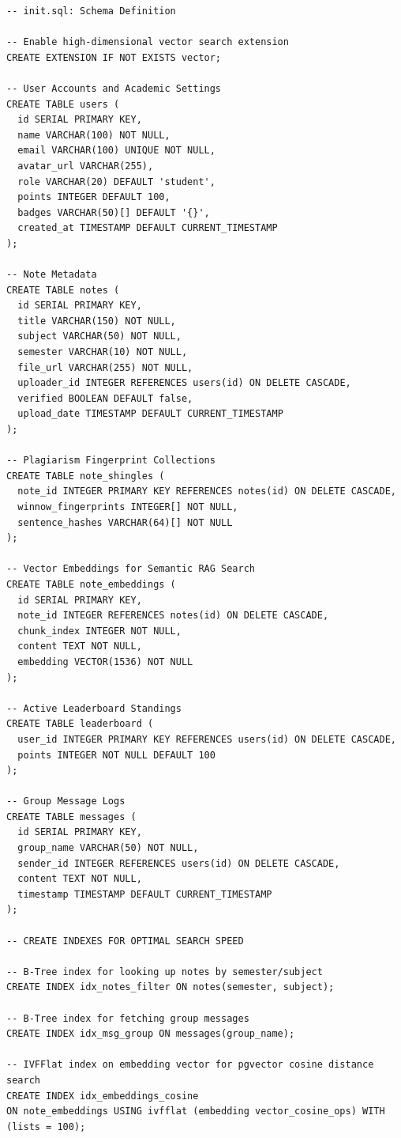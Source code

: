 \documentclass[12,Times new Roman,a4paper]{report}
\begin{document}
\begin{verbatim}
-- init.sql: Schema Definition

-- Enable high-dimensional vector search extension
CREATE EXTENSION IF NOT EXISTS vector;

-- User Accounts and Academic Settings
CREATE TABLE users (
  id SERIAL PRIMARY KEY,
  name VARCHAR(100) NOT NULL,
  email VARCHAR(100) UNIQUE NOT NULL,
  avatar_url VARCHAR(255),
  role VARCHAR(20) DEFAULT 'student',
  points INTEGER DEFAULT 100,
  badges VARCHAR(50)[] DEFAULT '{}',
  created_at TIMESTAMP DEFAULT CURRENT_TIMESTAMP
);

-- Note Metadata
CREATE TABLE notes (
  id SERIAL PRIMARY KEY,
  title VARCHAR(150) NOT NULL,
  subject VARCHAR(50) NOT NULL,
  semester VARCHAR(10) NOT NULL,
  file_url VARCHAR(255) NOT NULL,
  uploader_id INTEGER REFERENCES users(id) ON DELETE CASCADE,
  verified BOOLEAN DEFAULT false,
  upload_date TIMESTAMP DEFAULT CURRENT_TIMESTAMP
);

-- Plagiarism Fingerprint Collections
CREATE TABLE note_shingles (
  note_id INTEGER PRIMARY KEY REFERENCES notes(id) ON DELETE CASCADE,
  winnow_fingerprints INTEGER[] NOT NULL,
  sentence_hashes VARCHAR(64)[] NOT NULL
);

-- Vector Embeddings for Semantic RAG Search
CREATE TABLE note_embeddings (
  id SERIAL PRIMARY KEY,
  note_id INTEGER REFERENCES notes(id) ON DELETE CASCADE,
  chunk_index INTEGER NOT NULL,
  content TEXT NOT NULL,
  embedding VECTOR(1536) NOT NULL
);

-- Active Leaderboard Standings
CREATE TABLE leaderboard (
  user_id INTEGER PRIMARY KEY REFERENCES users(id) ON DELETE CASCADE,
  points INTEGER NOT NULL DEFAULT 100
);

-- Group Message Logs
CREATE TABLE messages (
  id SERIAL PRIMARY KEY,
  group_name VARCHAR(50) NOT NULL,
  sender_id INTEGER REFERENCES users(id) ON DELETE CASCADE,
  content TEXT NOT NULL,
  timestamp TIMESTAMP DEFAULT CURRENT_TIMESTAMP
);

-- CREATE INDEXES FOR OPTIMAL SEARCH SPEED

-- B-Tree index for looking up notes by semester/subject
CREATE INDEX idx_notes_filter ON notes(semester, subject);

-- B-Tree index for fetching group messages
CREATE INDEX idx_msg_group ON messages(group_name);

-- IVFFlat index on embedding vector for pgvector cosine distance search
CREATE INDEX idx_embeddings_cosine 
ON note_embeddings USING ivfflat (embedding vector_cosine_ops) WITH (lists = 100);
\end{verbatim}
\end{document}
